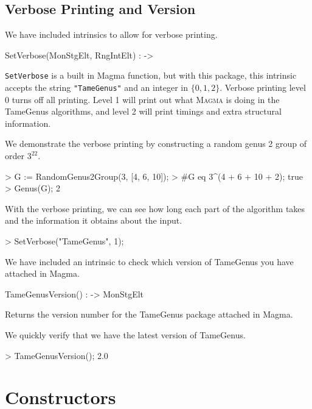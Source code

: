 \documentclass{documentation}
\begin{document}
\section{Verbose Printing and Version}

We have included intrinsics to allow for verbose printing. 

\begin{intrinsics}
SetVerbose(MonStgElt, RngIntElt) : -> 
\end{intrinsics}

\texttt{SetVerbose} is a built in Magma function, but with this package, this intrinsic accepts the string \texttt{"TameGenus"} and an integer in $\{0,1,2\}$. Verbose printing level 0 turns off all printing. 
Level 1 will print out what \textsc{Magma} is doing in the TameGenus algorithms, and level 2 will print timings and extra structural information.

\begin{example}[VerbosePrinting]
  We demonstrate the verbose printing by constructing a random genus 2 group of order $3^{22}$.

\begin{code}
> G := RandomGenus2Group(3, [4, 6, 10]);
> #G eq 3^(4 + 6 + 10 + 2);
true
> Genus(G);
2
\end{code}

With the verbose printing, we can see how long each part of the algorithm takes and the information it obtains about the input.
\begin{code}
> SetVerbose("TameGenus", 1);
\end{code}
\end{example}

We have included an intrinsic to check which version of TameGenus you have attached in Magma.

\begin{intrinsics}
TameGenusVersion() : -> MonStgElt
\end{intrinsics}

Returns the version number for the TameGenus package attached in Magma.

\begin{example}[Version]
    We quickly verify that we have the latest version of TameGenus. 
\begin{code}
> TameGenusVersion();
2.0    
\end{code}
\end{example}


\chapter{Constructors}
\end{document}
